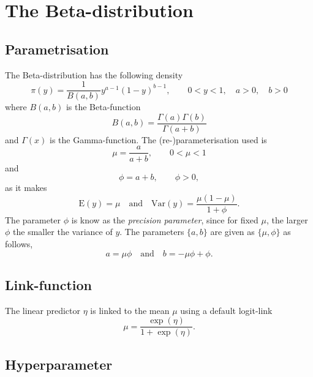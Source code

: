 \documentclass[a4paper,11pt]{article}
\begin{document}
\section*{The Beta-distribution}

\subsection*{Parametrisation}

The Beta-distribution has the following density
\begin{displaymath}
    \pi(y) = \frac{1}{B(a, b)} y^{a-1}(1-y)^{b-1}, \qquad 0 < y < 1,
    \quad a>0, \quad b > 0
\end{displaymath}
where $B(a, b)$
is the Beta-function 
\begin{displaymath}
    B(a, b) = \frac{\Gamma(a)\Gamma(b)}{\Gamma(a+b)}
\end{displaymath}
and $\Gamma(x)$ is the Gamma-function.
The (re-)parameterisation used is
\begin{displaymath}
    \mu = \frac{a}{a+b}, \qquad 0 < \mu < 1
\end{displaymath}
and
\begin{displaymath}
    \phi = a + b, \qquad \phi > 0,
\end{displaymath}
as it makes
\begin{displaymath}
    \text{E}(y) = \mu \quad\text{and}\quad \text{Var}(y) = \frac{\mu(1-\mu)}{1+\phi}.
\end{displaymath}
The parameter $\phi$ is know as the \emph{precision parameter}, since
for fixed $\mu$, the larger $\phi$ the smaller the variance of $y$.
The parameters $\{a, b\}$ are given as $\{\mu, \phi\}$ as follows,
\begin{displaymath}
    a = \mu \phi \quad\text{and}\quad  b = -\mu \phi + \phi.
\end{displaymath}


\subsection*{Link-function}

The linear predictor $\eta$ is linked to the mean $\mu$ using a
default logit-link
\begin{displaymath}
    \mu = \frac{\exp(\eta)}{1+\exp(\eta)}.
\end{displaymath}

\subsection*{Hyperparameter}
\end{document}
